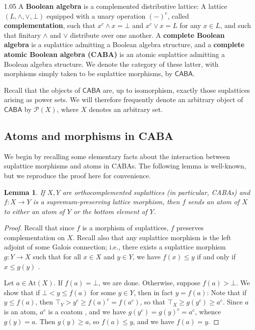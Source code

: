 \documentclass[reqno]{amsart}
\newcommand{\pow}{\mathcal{P}}
\newcommand{\cat}{\mathsf}
\numberwithin{equation}{section}
\theoremstyle{plain}
\newtheorem{lemma}[equation]{Lemma}
\theoremstyle{definition}
\begin{document}
\begin{spacing}{1.05}
A \textbf{Boolean algebra} is a complemented distributive lattice: A lattice $(L, \land, \lor, \bot)$ equipped with a unary operation $(-)^c$, called \textbf{complementation}, such that $x^c \land x = \bot$ and $x^c \lor x = L$ for any $x \in L$, and such that finitary $\land$ and $\lor$ distribute over one another. A \textbf{complete Boolean algebra} is a suplattice admitting a Boolean algebra structure, and a \textbf{complete atomic Boolean algebra (CABA)} is an atomic suplattice admitting a Boolean algebra structure. We denote the category of these latter, with morphisms simply taken to be suplattice morphisms, by $\cat{CABA}$.

Recall that the objects of $\cat{CABA}$ are, up to isomorphism, exactly those suplattices arising as power sets. We will therefore frequently denote an arbitrary object of $\cat{CABA}$ by $\pow(X)$, where $X$ denotes an arbitrary set.

\subsection{Atoms and morphisms in CABA} We begin by recalling some elementary facts about the interaction between suplattice morphisms and atoms in CABAs. The following lemma is well-known, but we reproduce the proof here for convenience.

\begin{lemma} \label{lem:caba-morphism-preserves-atoms}
    If $X,Y$ are orthocomplemented suplattices (in particular, CABAs) and $f : X \to Y$ is a supremum-preserving lattice morphism, then $f$ sends an atom of $X$ to either an atom of $Y$ or the bottom element of $Y$.
\end{lemma}

\begin{proof}
    Recall that since $f$ is a morphism of suplattices, $f$ preserves complementation on $X$. Recall also that any suplattice morphism is the left adjoint of some Galois connection; i.e., there exists a suplattice morphism $g : Y \to X$ such that for all $x \in X$ and $y \in Y$, we have $f(x) \leq y$ if and only if $x \leq g(y)$ \cite[3.5.ii]{compendium-of-complete-lattices}. 
    
    Let $a \in \text{At}(X)$. If $f(a) = \bot$, we are done. Otherwise, suppose $f(a) > \bot$. We show that if $\bot < y \leq f(a)$ for some $y \in Y$, then in fact $y = f(a)$: Note that if $y \leq f(a)$, then $\top_Y > y^c \geq f(a)^c = f(a^c)$, so that $\top_X \geq  g(y^c) \geq a^c$. Since $a$ is an atom, $a^c$ is a coatom \cite[6.3]{blyth-lattices}, and we have $g(y^c) = g(y)^c = a^c$, whence $g(y) = a$. Then $g(y) \geq a$, so $f(a) \leq y$, and we have $f(a) = y$.
\end{proof}


\end{spacing}
\end{document}
